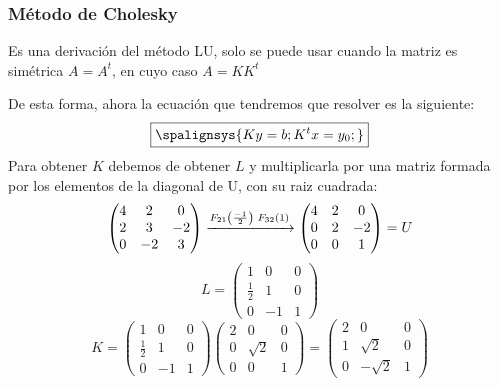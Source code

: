 \subsubsection{Método de Cholesky}
Es una derivación del método LU, solo se puede usar cuando la matriz es simétrica \(A = A^t\), en cuyo caso \(A = KK^t\)
\par  De esta forma, ahora la ecuación que tendremos que resolver es la siguiente:
\[
        \boxed{
                \spalignsys{
                        Ky = b ;
                        K^tx = y_0;
                }}
\]
Para obtener \(K\) debemos de obtener \(L\) y multiplicarla por una matriz formada por los elementos de la diagonal de U, con su raiz cuadrada:
\[
        \begin{pmatrix}
                4 & 2  & 0  \\
                2 & 3  & -2 \\
                0 & -2 & 3
        \end{pmatrix}
        \xrightarrow[]{F_{21}\left ( \frac{-1}{2} \right ) \hspace{1mm} F_{32}(1)}
        \begin{pmatrix}
                4 & 2 & 0  \\
                0 & 2 & -2 \\
                0 & 0 & 1
        \end{pmatrix}
        = U
\]
\[
        L = \begin{pmatrix}
                1           & 0  & 0 \\
                \frac{1}{2} & 1  & 0 \\
                0           & -1 & 1
        \end{pmatrix}
\]
\[
        K = \begin{pmatrix}
                1           & 0  & 0 \\
                \frac{1}{2} & 1  & 0 \\
                0           & -1 & 1
        \end{pmatrix}
        \begin{pmatrix}
                2 & 0        & 0 \\
                0 & \sqrt{2} & 0 \\
                0 & 0        & 1
        \end{pmatrix}
        =
        \begin{pmatrix}
                2 & 0         & 0 \\
                1 & \sqrt{2}  & 0 \\
                0 & -\sqrt{2} & 1
        \end{pmatrix}
\]